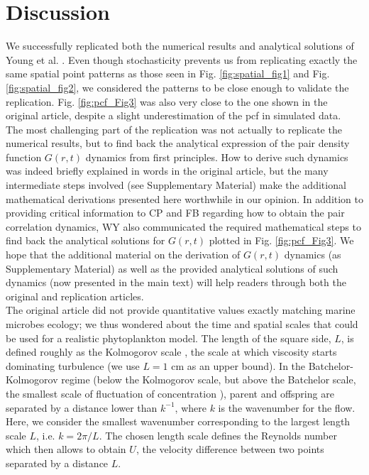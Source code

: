 \section*{Discussion}

We successfully replicated both the numerical results and analytical solutions of Young et al. \citep{young_reproductive_2001}. Even though stochasticity prevents us from replicating exactly the same spatial point patterns as those seen in Fig. \ref{fig:spatial_fig1} and Fig. \ref{fig:spatial_fig2}, we considered the patterns to be close enough to validate the replication. Fig. \ref{fig:pcf_Fig3} was also very close to the one shown in the original article, despite a slight underestimation of the pcf in simulated data.\\

The most challenging part of the replication was not actually to replicate the numerical results, but to find back the analytical expression of the pair density function $G(r,t)$ dynamics from first principles. How to derive such dynamics was indeed briefly explained in words in the original article, but the many intermediate steps involved (see Supplementary Material) make the additional mathematical derivations presented here worthwhile in our opinion. In addition to providing critical information to CP and FB regarding how to obtain the pair correlation dynamics, WY also communicated the required mathematical steps to find back the analytical solutions for $G(r,t)$ plotted in Fig. \ref{fig:pcf_Fig3}. We hope that the additional material on the derivation of $G(r,t)$ dynamics (as Supplementary Material) as well as the provided analytical solutions of such dynamics (now presented in the main text) will help readers through both the original and replication articles. \\

The original article did not provide quantitative values exactly matching marine microbes ecology; we thus wondered about the time and spatial scales that could be used for a realistic phytoplankton model. The length of the square side, $L$, is defined roughly as the Kolmogorov scale {\color{blue} \citep{tennekes1972first}}, the scale at which viscosity starts dominating turbulence  (we use $L= 1$ cm as an upper bound). In the Batchelor-Kolmogorov regime {\color{blue}(below the Kolmogorov scale, but above the Batchelor scale, the smallest scale of fluctuation of concentration \citealt{peters_effects_2000})}, parent and offspring are separated by a distance lower than $k^{-1}$, where $k$ is the wavenumber for the flow. Here, we consider the smallest wavenumber corresponding to the largest length scale $L$, i.e. $k=2\pi/L$. The chosen length scale defines the Reynolds number which then allows to obtain $U$, the velocity difference between two points separated by a distance $L$.  
 
